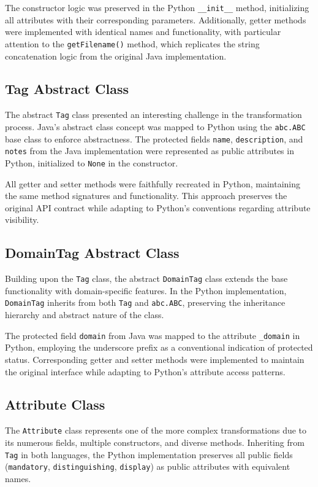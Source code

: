 \documentclass[12pt,a4paper]{article}
\begin{document}
The constructor logic was preserved in the Python \texttt{\_\_init\_\_} method, initializing all attributes with their corresponding parameters. Additionally, getter methods were implemented with identical names and functionality, with particular attention to the \texttt{getFilename()} method, which replicates the string concatenation logic from the original Java implementation.

\subsection{Tag Abstract Class}
The abstract \texttt{Tag} class presented an interesting challenge in the transformation process. Java's abstract class concept was mapped to Python using the \texttt{abc.ABC} base class to enforce abstractness. The protected fields \texttt{name}, \texttt{description}, and \texttt{notes} from the Java implementation were represented as public attributes in Python, initialized to \texttt{None} in the constructor.

All getter and setter methods were faithfully recreated in Python, maintaining the same method signatures and functionality. This approach preserves the original API contract while adapting to Python's conventions regarding attribute visibility.

\subsection{DomainTag Abstract Class}
Building upon the \texttt{Tag} class, the abstract \texttt{DomainTag} class extends the base functionality with domain-specific features. In the Python implementation, \texttt{DomainTag} inherits from both \texttt{Tag} and \texttt{abc.ABC}, preserving the inheritance hierarchy and abstract nature of the class.

The protected field \texttt{domain} from Java was mapped to the attribute \texttt{\_domain} in Python, employing the underscore prefix as a conventional indication of protected status. Corresponding getter and setter methods were implemented to maintain the original interface while adapting to Python's attribute access patterns.

\subsection{Attribute Class}
The \texttt{Attribute} class represents one of the more complex transformations due to its numerous fields, multiple constructors, and diverse methods. Inheriting from \texttt{Tag} in both languages, the Python implementation preserves all public fields (\texttt{mandatory}, \texttt{distinguishing}, \texttt{display}) as public attributes with equivalent names.
\end{document}
